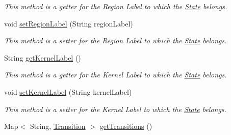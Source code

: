 \begin{DoxyCompactItemize}
\begin{DoxyCompactList}\small\item\em This method is a getter for the Region Label to which the \hyperlink{classese_1_1seas_1_1upenn_1_1edu_1_1_state}{State} belongs. \end{DoxyCompactList}\item 
\hypertarget{classese_1_1seas_1_1upenn_1_1edu_1_1_state_aeaa23bcd638d8771032963a71e1100ee}{}void \hyperlink{classese_1_1seas_1_1upenn_1_1edu_1_1_state_aeaa23bcd638d8771032963a71e1100ee}{set\+Region\+Label} (String region\+Label)\label{classese_1_1seas_1_1upenn_1_1edu_1_1_state_aeaa23bcd638d8771032963a71e1100ee}

\begin{DoxyCompactList}\small\item\em This method is a setter for the Region Label to which the \hyperlink{classese_1_1seas_1_1upenn_1_1edu_1_1_state}{State} belongs. \end{DoxyCompactList}\item 
\hypertarget{classese_1_1seas_1_1upenn_1_1edu_1_1_state_a91db5f49031a058a349fbec466a4af29}{}String \hyperlink{classese_1_1seas_1_1upenn_1_1edu_1_1_state_a91db5f49031a058a349fbec466a4af29}{get\+Kernel\+Label} ()\label{classese_1_1seas_1_1upenn_1_1edu_1_1_state_a91db5f49031a058a349fbec466a4af29}

\begin{DoxyCompactList}\small\item\em This method is a getter for the Kernel Label to which the \hyperlink{classese_1_1seas_1_1upenn_1_1edu_1_1_state}{State} belongs. \end{DoxyCompactList}\item 
\hypertarget{classese_1_1seas_1_1upenn_1_1edu_1_1_state_a7e3024a79defcd36529d048f3862a9c7}{}void \hyperlink{classese_1_1seas_1_1upenn_1_1edu_1_1_state_a7e3024a79defcd36529d048f3862a9c7}{set\+Kernel\+Label} (String kernel\+Label)\label{classese_1_1seas_1_1upenn_1_1edu_1_1_state_a7e3024a79defcd36529d048f3862a9c7}

\begin{DoxyCompactList}\small\item\em This method is a setter for the Kernel Label to which the \hyperlink{classese_1_1seas_1_1upenn_1_1edu_1_1_state}{State} belongs. \end{DoxyCompactList}\item 
\hypertarget{classese_1_1seas_1_1upenn_1_1edu_1_1_state_ada81ad54ed6e47f678fc64542453ad8d}{}Map$<$ String, \hyperlink{classese_1_1seas_1_1upenn_1_1edu_1_1_transition}{Transition} $>$ \hyperlink{classese_1_1seas_1_1upenn_1_1edu_1_1_state_ada81ad54ed6e47f678fc64542453ad8d}{get\+Transitions} ()\label{classese_1_1seas_1_1upenn_1_1edu_1_1_state_ada81ad54ed6e47f678fc64542453ad8d}


\end{DoxyCompactItemize}
